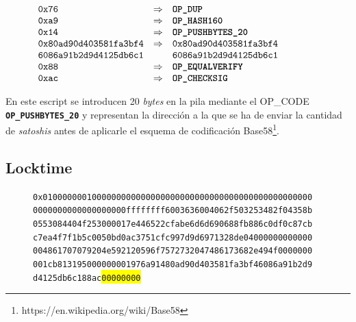 \documentclass{article}
\begin{document}
    \begin{figure}[H]
        $\begin{array}{lcl}
            \texttt{0x76} & \Rightarrow & \textbf{\texttt{OP\_DUP}} \\
            \texttt{0xa9} & \Rightarrow & \textbf{\texttt{OP\_HASH160}}\\
            \texttt{0x14} & \Rightarrow & \textbf{\texttt{OP\_PUSHBYTES\_20}} \\
            \texttt{0x80ad90d403581fa3bf4} & \Rightarrow & \texttt{0x80ad90d403581fa3bf4} \\
            \texttt{6086a91b2d9d4125db6c1} & & \texttt{6086a91b2d9d4125db6c1} \\
            \texttt{0x88} & \Rightarrow & \textbf{\texttt{OP\_EQUALVERIFY}} \\
            \texttt{0xac} & \Rightarrow & \textbf{\texttt{OP\_CHECKSIG}}
        \end{array}$
    \end{figure}
    En este escript se introducen 20 \textit{bytes} en la pila mediante el OP\_CODE \textbf{\texttt{OP\_PUSHBYTES\_20}} y representan la dirección a la que se ha de enviar la cantidad de \textit{satoshis} antes de aplicarle el esquema de codificación Base58\footnote{https://en.wikipedia.org/wiki/Base58}.
    
    \subsection{Locktime}
    
    \begin{figure}[H]
        \texttt{0x0100000001000000000000000000000000000000000000000000000} \\
        \texttt{0000000000000000000ffffffff6003636004062f503253482f04358b} \\
        \texttt{0553084404f253000017e446522cfabe6d6d690688fb886c0df0c87cb} \\
        \texttt{c7ea4f7f1b5c0050bd0ac3751cfc997d9d6971328de04000000000000} \\
        \texttt{004861707079204e592120596f7572732047486173682e494f0000000} \\
        \texttt{001cb813195000000001976a91480ad90d403581fa3bf46086a91b2d9} \\
        \texttt{d4125db6c188ac\colorbox{Yellow}{00000000}}
    \end{figure}
    
\end{document}
